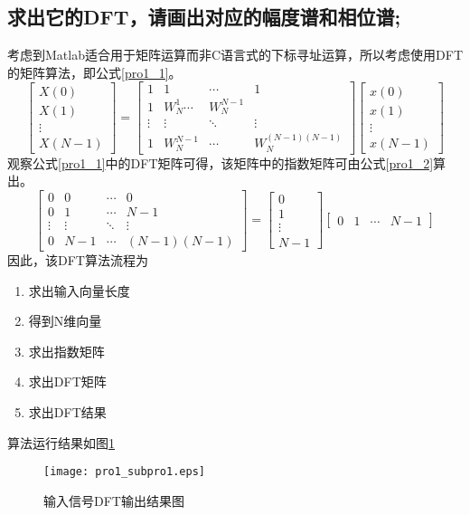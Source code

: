 \documentclass[aps,letterpaper,10pt]{revtex4}
\begin{document}
\begin{CJK}{UTF8}{gkai}
\subsection{求出它的DFT，请画出对应的幅度谱和相位谱;}
考虑到Matlab适合用于矩阵运算而非C语言式的下标寻址运算，所以考虑使用DFT的矩阵算法，即公式\ref{pro1_1}。
\begin{equation}
\left[\begin{array}{c}
X(0)\\
X(1)\\
\vdots\\
X(N-1)
\end{array}\right]
=
\left[\begin{array}{cccc}
1 & 1 & \cdots & 1\\
1 & W_N^1 \cdots & W_N^{N-1}\\
\vdots&\vdots&\ddots&\vdots\\
1 & W_N^{N-1} & \cdots & W_N^{(N-1)(N-1)}
\end{array}
\right]
\left[
\begin{array}{c}
  x(0)\\
  x(1)\\
  \vdots\\
  x(N-1)
\end{array}
\right]\label{pro1_1}
\end{equation}
观察公式\ref{pro1_1}中的DFT矩阵可得，该矩阵中的指数矩阵可由公式\ref{pro1_2}算出。
\begin{equation}
  \left[\begin{array}{cccc}
  0&0&\cdots&0\\
  0&1&\cdots&N-1\\
  \vdots&\vdots&\ddots&\vdots\\
  0&N-1&\cdots&(N-1)(N-1)
  \end{array}
  \right]
  =
  \left[\begin{array}{c}
  0\\
  1\\
  \vdots\\
  N-1
  \end{array}
  \right]
  \left[\begin{array}{cccc}
  0&1&\cdots&N-1
  \end{array}
  \right]\label{pro1_2}
\end{equation}
因此，该DFT算法流程为
\begin{enumerate}
  \item 求出输入向量长度
  \item 得到N维向量
  \item 求出指数矩阵
  \item 求出DFT矩阵
  \item 求出DFT结果
\end{enumerate}
算法运行结果如图\ref{pro1_fig1}
\begin{figure}
  \centering
  \texttt{[image: pro1\_subpro1.eps]}
  \caption{输入信号DFT输出结果图}
  \label{pro1_fig1}
\end{figure}


\end{CJK}
\end{document}
